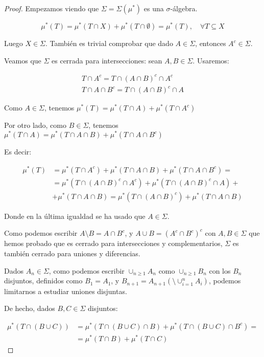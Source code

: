 \begin{proof}
 Empezamos viendo que $\Sigma = \Sigma(\mu^\ast)$ es una $\sigma$-álgebra.
 
 \[\mu^\ast(T) = \mu^\ast(T\cap X) + \mu^\ast(T\cap \emptyset) = \mu^\ast(T), \quad \forall T\subseteq X\]
 
 Luego $X \in \Sigma$. También es trivial comprobar que dado $A\in \Sigma$, entonces $A^c \in \Sigma$.
 
 Veamos que $\Sigma$ es cerrada para intersecciones: sean $A, B\in \Sigma$. Usaremos:
 
 \begin{align*}
  T\cap A^c = T\cap (A\cap B)^c \cap A^c\\
  T\cap A \cap B^c = T \cap (A\cap B)^c \cap A
 \end{align*}

 Como $A\in \Sigma$, tenemos $\mu^\ast(T) = \mu^\ast(T\cap A) + \mu^\ast(T\cap A^c)$
 
 Por otro lado, como $B\in \Sigma$, tenemos $\mu^\ast(T\cap A) = \mu^\ast(T\cap A\cap B) + \mu^\ast(T\cap A \cap B^c)$
 
 Es decir:
 
 \begin{align*}
  \mu^\ast(T) &= \mu^\ast(T\cap A^c) + \mu^\ast(T\cap A \cap B) + \mu^\ast(T\cap A \cap B^c) = \\
  &= \mu^\ast(T\cap (A\cap B)^c \cap A^c) + \mu^\ast(T \cap (A\cap B)^c \cap A) +\\
  &+ \mu^\ast(T\cap A \cap B) = \mu^\ast(T\cap (A \cap B)^c) + \mu^\ast(T\cap A \cap B)
 \end{align*}

 Donde en la última igualdad se ha usado que $A\in \Sigma$.
 
 Como podemos escribir $A\setminus B = A\cap B^c$, y $A\cup B = (A^c \cap B^c)^c$ con $A, B \in \Sigma$ que
 hemos probado que es cerrado para intersecciones y complementarios, $\Sigma$ es también cerrado para
 uniones y diferencias.
 
 Dados $A_n \in \Sigma$, como podemos escribir $\cup_{n\ge 1} A_n$ como $\cup_{n\ge 1} B_n$ con los $B_n$ 
 disjuntos, definidos como $B_1 = A_1$, y $B_{n+1} = A_{n+1} \left(\setminus{\cup_{i=1}^n A_i}\right)$, 
 podemos limitarnos a estudiar uniones disjuntas.
 
 De hecho, dados $B,C \in \Sigma$ disjuntos:
 
 \begin{align*}
  \mu^\ast(T \cap (B\cup C)) &= \mu^\ast(T \cap(B\cup C) \cap B) + \mu^\ast(T \cap(B\cup C) \cap B^c) =\\
                             &= \mu^\ast(T \cap B) + \mu^\ast(T \cap C)
 \end{align*}


\end{proof}
